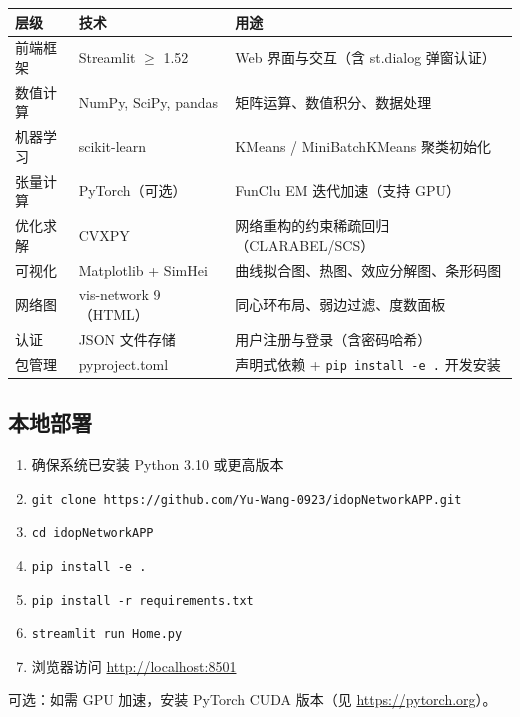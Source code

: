 \documentclass[12pt,a4paper]{ctexart}
\begin{document}
\begin{center}
\small
\begin{tabular}{@{}lll@{}}
\toprule
\textbf{层级} & \textbf{技术} & \textbf{用途} \\
\midrule
前端框架 & Streamlit $\geq$ 1.52 & Web 界面与交互（含 st.dialog 弹窗认证）\\
数值计算 & NumPy, SciPy, pandas & 矩阵运算、数值积分、数据处理 \\
机器学习 & scikit-learn & KMeans / MiniBatchKMeans 聚类初始化 \\
张量计算 & PyTorch（可选）  & FunClu EM 迭代加速（支持 GPU）\\
优化求解 & CVXPY           & 网络重构的约束稀疏回归（CLARABEL/SCS）\\
可视化   & Matplotlib + SimHei & 曲线拟合图、热图、效应分解图、条形码图\\
网络图   & vis-network 9（HTML） & 同心环布局、弱边过滤、度数面板\\
认证     & JSON 文件存储   & 用户注册与登录（含密码哈希）\\
包管理   & pyproject.toml  & 声明式依赖 + \texttt{pip install -e .} 开发安装\\
\bottomrule
\end{tabular}
\end{center}

\subsection{本地部署}

\begin{stepbox}[部署步骤]
    \begin{enumerate}[leftmargin=*]
        \item 确保系统已安装 Python 3.10 或更高版本
        \item \texttt{git clone https://github.com/Yu-Wang-0923/idopNetworkAPP.git}
        \item \texttt{cd idopNetworkAPP}
        \item \texttt{pip install -e .}
        \item \texttt{pip install -r requirements.txt}
        \item \texttt{streamlit run Home.py}
        \item 浏览器访问 \url{http://localhost:8501}
    \end{enumerate}
    可选：如需 GPU 加速，安装 PyTorch CUDA 版本（见 \url{https://pytorch.org}）。
\end{stepbox}
\end{document}
